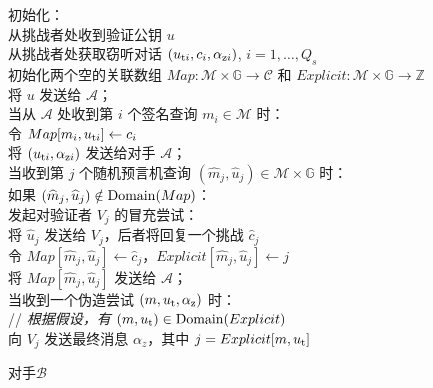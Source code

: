 \begin{figure}
  \hspace*{45pt} 初始化：\\
  \hspace*{70pt} 从挑战者处收到验证公钥 $u$\\
  \hspace*{70pt} 从挑战者处获取窃听对话 $(u_{{\rm t}i},c_i,\alpha_{{\rm z}i})$, $i=1,\dots,Q_s$\\
  \hspace*{70pt} 初始化两个空的关联数组 $Map:\mathcal{M}\times\mathbb{G}\to\mathcal{C}$ 和 $Explicit:\mathcal{M}\times\mathbb{G}\to\mathbb{Z}$\\
  \hspace*{70pt} 将 $u$ 发送给 $\mathcal{A}$；\\
  \hspace*{45pt} 当从 $\mathcal{A}$ 处收到第 $i$ 个签名查询 $m_i\in\mathcal{M}$ 时：\\
  \hspace*{70pt} 令 $Map[m_i,u_{{\rm t}i}]\leftarrow c_i$\\
  \hspace*{70pt} 将 $(u_{{\rm t}i},\alpha_{{\rm z}i})$ 发送给对手 $\mathcal{A}$；\\
  \hspace*{45pt} 当收到第 $j$ 个随机预言机查询 $(\widehat m_j,\widehat u_j)\in\mathcal{M}\times\mathbb{G}$ 时：\\
  \hspace*{70pt} 如果 $(\widehat m_j,\widehat u_j)\notin{\rm Domain}(Map)$：\\
  \hspace*{95pt} 发起对验证者 $V_j$ 的冒充尝试：\\
  \hspace*{120pt} 将 $\widehat u_j$ 发送给 $V_j$，后者将回复一个挑战 $\widehat c_j$\\
  \hspace*{95pt} 令 $Map[\widehat m_j,\widehat u_j]\leftarrow\widehat c_j$，$Explicit[\widehat m_j,\widehat u_j]\leftarrow j$\\
  \hspace*{70pt} 将 $Map[\widehat m_j,\widehat u_j]$ 发送给 $\mathcal{A}$；\\
  \hspace*{45pt} 当收到一个伪造尝试 $(m,u_{\rm t},\alpha_{\rm z})$ 时：\\
  \hspace*{70pt} // \emph{根据假设，有 $(m,u_{\rm t})\in{\rm Domain}(Explicit)$}\\
  \hspace*{70pt} 向 $V_j$ 发送最终消息 $\alpha_z$，其中 $j=Explicit[m,u_{\rm t}]$\\
  \caption{对手$\mathcal{B}$}
  \label{fig:19-4}
\end{figure}

